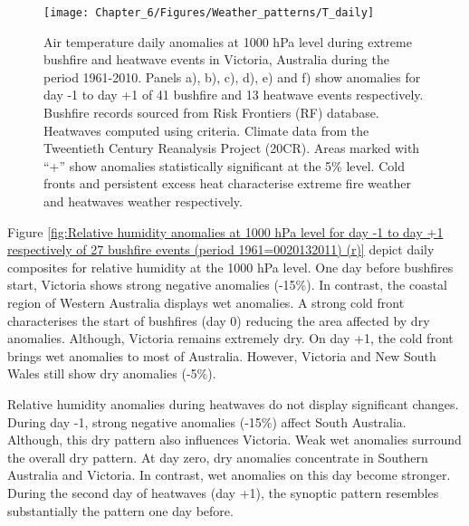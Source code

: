 \begin{figure}[h]
\noindent \begin{centering}
\texttt{[image: Chapter\_6/Figures/Weather\_patterns/T\_daily]}
\par\end{centering}

\caption[Air temperature daily anomalies at 1000 hPa level during extreme bushfire
and heatwave events in Victoria, Australia during the period 1961-2010]{Air temperature daily anomalies at 1000 hPa level during extreme bushfire
and heatwave events in Victoria, Australia during the period 1961-2010.
Panels a), b), c), d), e) and f) show anomalies for day -1 to day
+1 of 41 bushfire and 13 heatwave events respectively. Bushfire records
sourced from Risk Frontiers (RF) database. Heatwaves computed using
\citet{Pezza2012} criteria. Climate data from the Tweentieth Century
Reanalysis Project (20CR). Areas marked with ``+'' show anomalies
statistically significant at the 5\% level. Cold fronts and persistent
excess heat characterise extreme fire weather and heatwaves weather
respectively.\label{fig:Air temperature anomalies at 1000 hPa level for day -1 to day +1 respectively of 27 bushfire events (period 1961=0020132011) (r)}}
\end{figure}
 

Figure \ref{fig:Relative humidity anomalies at 1000 hPa level for day -1 to day +1 respectively of 27 bushfire events (period 1961=0020132011) (r)}
depict daily composites for relative humidity at the 1000 hPa level.
One day before bushfires start, Victoria shows strong negative anomalies
(-15\%). In contrast, the coastal region of Western Australia displays
wet anomalies. A strong cold front characterises the start of bushfires
(day 0) reducing the area affected by dry anomalies. Although, Victoria
remains extremely dry. On day +1, the cold front brings wet anomalies
to most of Australia. However, Victoria and New South Wales still
show dry anomalies (-5\%). 

Relative humidity anomalies during heatwaves do not display significant
changes. During day -1, strong negative anomalies (-15\%) affect South
Australia. Although, this dry pattern also influences Victoria. Weak
wet anomalies surround the overall dry pattern. At day zero, dry anomalies
concentrate in Southern Australia and Victoria. In contrast, wet anomalies
on this day become stronger. During the second day of heatwaves (day
+1), the synoptic pattern resembles substantially the pattern one
day before.

